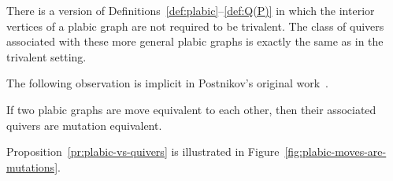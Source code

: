 \documentclass[ALCO,ThmDefs,Unicode,epreuves,published]{cedram}
\begin{document}
\begin{remark}
There is a version of Definitions~\ref{def:plabic}--\ref{def:Q(P)} 
in which the interior vertices of a plabic graph are not required to be trivalent. 
The class of quivers associated with these more general plabic graphs 
is exactly the same as in the trivalent setting. 
\end{remark}

The following observation is implicit in Postnikov's original work~\cite{postnikov}.

\begin{proposition} %
\label{pr:plabic-vs-quivers}
If two plabic graphs are move equivalent to each other, 
then their associated quivers are mutation equivalent. 
\end{proposition}

Proposition~\ref{pr:plabic-vs-quivers} is illustrated in 
Figure~\ref{fig:plabic-moves-are-mutations}. 


\end{document}
